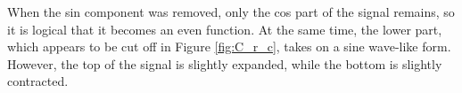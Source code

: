 When the sin component was removed, only the cos part of the signal remains, so it is logical that it becomes an even function. At the same time, the lower part, which appears to be cut off in Figure \ref{fig:C_r_c}, takes on a sine wave-like form. However, the top of the signal is slightly expanded, while the bottom is slightly contracted.

\pagebreak